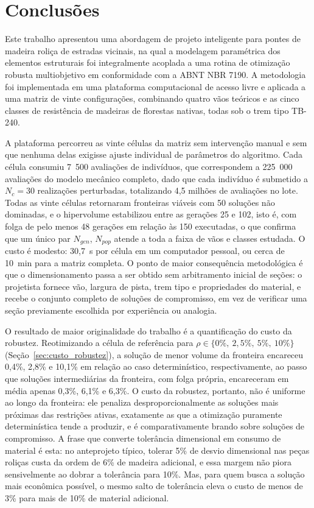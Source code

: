\section{Conclusões}\label{sec:conclusoes}


Este trabalho apresentou uma abordagem de projeto inteligente para pontes de madeira roliça de estradas vicinais, na qual a modelagem paramétrica dos elementos estruturais foi integralmente acoplada a uma rotina de otimização robusta multiobjetivo em conformidade com a ABNT NBR 7190.
A metodologia foi implementada em uma plataforma computacional de acesso livre e aplicada a uma matriz de vinte configurações, combinando quatro vãos teóricos e as cinco classes de resistência de madeiras de florestas nativas, todas sob o trem tipo TB-240.

A plataforma percorreu as vinte células da matriz sem intervenção manual e sem que nenhuma delas exigisse ajuste individual de parâmetros do algoritmo.
Cada célula consumiu 7~500 avaliações de indivíduos, que correspondem a 225~000 avaliações do modelo mecânico completo, dado que cada indivíduo é submetido a $N_c = 30$ realizações perturbadas, totalizando 4{,}5 milhões de avaliações no lote.
Todas as vinte células retornaram fronteiras viáveis com 50 soluções não dominadas, e o hipervolume estabilizou entre as gerações 25 e 102, isto é, com folga de pelo menos 48 gerações em relação às 150 executadas, o que confirma que um único par $N_{gen}$, $N_{pop}$ atende a toda a faixa de vãos e classes estudada.
O custo é modesto: 30{,}7~s por célula em um computador pessoal, ou cerca de 10~min para a matriz completa.
O ponto de maior consequência metodológica é que o dimensionamento passa a ser obtido sem arbitramento inicial de seções: o projetista fornece vão, largura de pista, trem tipo e propriedades do material, e recebe o conjunto completo de soluções de compromisso, em vez de verificar uma seção previamente escolhida por experiência ou analogia.


O resultado de maior originalidade do trabalho é a quantificação do custo da robustez.
Reotimizando a célula de referência para $\rho \in \{0\%,\ 2{,}5\%,\ 5\%,\ 10\%\}$ (Seção~\ref{sec:custo_robustez}), a solução de menor volume da fronteira encareceu 0{,}4\%, 2{,}8\% e 10{,}1\% em relação ao caso determinístico, respectivamente, ao passo que soluções intermediárias da fronteira, com folga própria, encareceram em média apenas 0{,}3\%, 6{,}1\% e 6{,}3\%.
O custo da robustez, portanto, não é uniforme ao longo da fronteira: ele penaliza desproporcionalmente as soluções mais próximas das restrições ativas, exatamente as que a otimização puramente determinística tende a produzir, e é comparativamente brando sobre soluções de compromisso.
A frase que converte tolerância dimensional em consumo de material é esta: no anteprojeto típico, tolerar 5\% de desvio dimensional nas peças roliças custa da ordem de 6\% de madeira adicional, e essa margem não piora sensivelmente ao dobrar a tolerância para 10\%. Mas, para quem busca a solução mais econômica possível, o mesmo salto de tolerância eleva o custo de menos de 3\% para mais de 10\% de material adicional.


